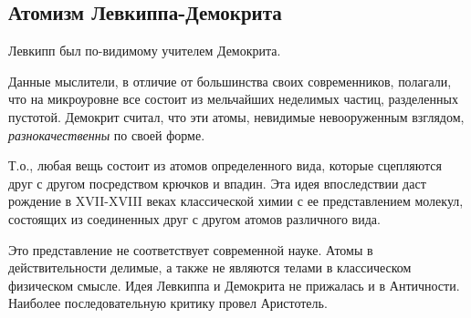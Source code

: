 \subsection{Атомизм Левкиппа-Демокрита} Левкипп был по-видимому учителем Демокрита. 

Данные мыслители, в отличие от большинства своих современников, полагали, что на микроуровне все состоит из мельчайших неделимых частиц, разделенных пустотой.
Демокрит считал, что эти атомы, невидимые невооруженным взглядом, \textit{разнокачественны} по своей форме. 

Т.о., любая вещь состоит из атомов определенного вида, которые сцепляются друг с другом посредством крючков и впадин. Эта идея впоследствии даст рождение в XVII-XVIII веках классической химии с ее представлением молекул, состоящих из соединенных друг с другом атомов различного вида. 

Это представление не соответствует современной науке. Атомы в действительности делимые, а также не являются телами в классическом физическом смысле. Идея Левкиппа и Демокрита не прижалась и в Античности. Наиболее последовательную критику провел Аристотель. 

